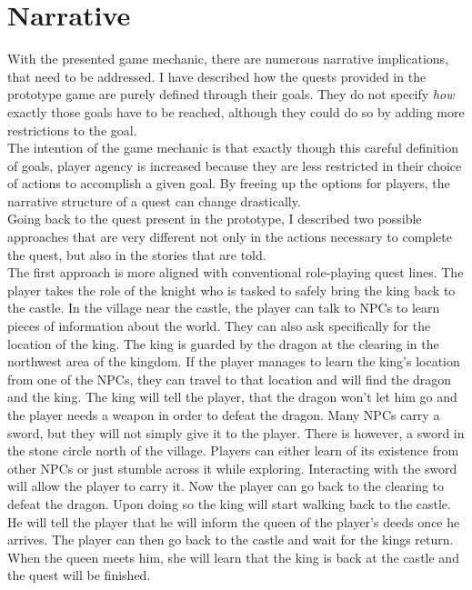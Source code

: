 \section{Narrative}
With the presented game mechanic, there are numerous narrative implications, that need to be addressed. I have described how the quests provided in the prototype game are purely defined through their goals. They do not specify \textit{how} exactly those goals have to be reached, although they could do so by adding more restrictions to the goal.\\
The intention of the game mechanic is that exactly though this careful definition of goals, player agency is increased because they are less restricted in their choice of actions to accomplish a given goal. By freeing up the options for players, the narrative structure of a quest can change drastically.\\
Going back to the quest present in the prototype, I described two possible approaches that are very different not only in the actions necessary to complete the quest, but also in the stories that are told.\\
The first approach is more aligned with conventional role-playing quest lines. The player takes the role of the knight who is tasked to safely bring the king back to the castle. In the village near the castle, the player can talk to NPCs to learn pieces of information about the world. They can also ask specifically for the location of the king. The king is guarded by the dragon at the clearing in the northwest area of the kingdom. If the player manages to learn the king's location from one of the NPCs, they can travel to that location and will find the dragon and the king. The king will tell the player, that the dragon won't let him go and the player needs a weapon in order to defeat the dragon. Many NPCs carry a sword, but they will not simply give it to the player. There is however, a sword in the stone circle north of the village. Players can either learn of its existence from other NPCs or just stumble across it while exploring. Interacting with the sword will allow the player to carry it. Now the player can go back to the clearing to defeat the dragon. Upon doing so the king will start walking back to the castle. He will tell the player that he will inform the queen of the player's deeds once he arrives. The player can then go back to the castle and wait for the kings return. When the queen meets him, she will learn that the king is back at the castle and the quest will be finished.\\
